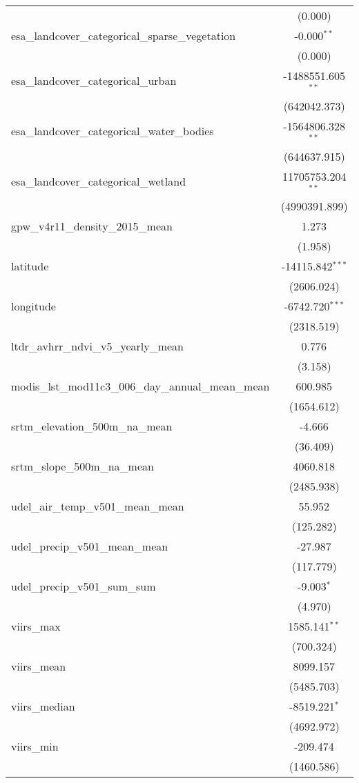 \begin{table}[!htbp]
\begin{tabular}{@{\extracolsep{5pt}}lc}
  & (0.000) \\
 esa_landcover_categorical_sparse_vegetation & -0.000$^{**}$ \\
  & (0.000) \\
 esa_landcover_categorical_urban & -1488551.605$^{**}$ \\
  & (642042.373) \\
 esa_landcover_categorical_water_bodies & -1564806.328$^{**}$ \\
  & (644637.915) \\
 esa_landcover_categorical_wetland & 11705753.204$^{**}$ \\
  & (4990391.899) \\
 gpw_v4r11_density_2015_mean & 1.273$^{}$ \\
  & (1.958) \\
 latitude & -14115.842$^{***}$ \\
  & (2606.024) \\
 longitude & -6742.720$^{***}$ \\
  & (2318.519) \\
 ltdr_avhrr_ndvi_v5_yearly_mean & 0.776$^{}$ \\
  & (3.158) \\
 modis_lst_mod11c3_006_day_annual_mean_mean & 600.985$^{}$ \\
  & (1654.612) \\
 srtm_elevation_500m_na_mean & -4.666$^{}$ \\
  & (36.409) \\
 srtm_slope_500m_na_mean & 4060.818$^{}$ \\
  & (2485.938) \\
 udel_air_temp_v501_mean_mean & 55.952$^{}$ \\
  & (125.282) \\
 udel_precip_v501_mean_mean & -27.987$^{}$ \\
  & (117.779) \\
 udel_precip_v501_sum_sum & -9.003$^{*}$ \\
  & (4.970) \\
 viirs_max & 1585.141$^{**}$ \\
  & (700.324) \\
 viirs_mean & 8099.157$^{}$ \\
  & (5485.703) \\
 viirs_median & -8519.221$^{*}$ \\
  & (4692.972) \\
 viirs_min & -209.474$^{}$ \\
  & (1460.586) \\

\end{tabular}
\end{table}
